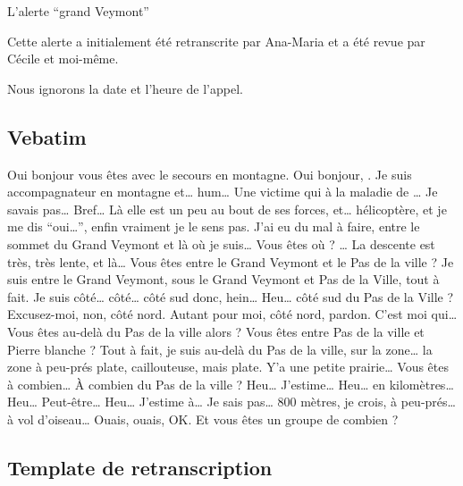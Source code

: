 L'alerte \enquote{grand Veymont}


Cette alerte a initialement été retranscrite par Ana-Maria
 et a été revue par Cécile  et
moi-même.

Nous ignorons la date et l'heure de l'appel.

\subsection{Vebatim}
\label{anx:retrans-gv-verb}


\begin{dialogue}
  \Sec Oui bonjour vous êtes avec le secours en montagne.
  \Req Oui bonjour, . Je suis accompagnateur en
  montagne et… hum… Une victime qui à la maladie de
  … Je savais pas… Bref… Là elle est un peu au bout de
  ses forces, et…  hélicoptère, et je me dis
  \enquote{oui…}, enfin vraiment je le sens pas. J'ai eu du mal à
  faire, entre le sommet du Grand Veymont et là où je suis…
  \Sec {} Vous êtes où ?
  \Req … La descente est très, très lente, et là…
  \Sec Vous êtes entre le Grand Veymont et le Pas de la ville ?
  \Req Je suis entre le Grand Veymont, sous le Grand Veymont et Pas de
  la Ville, tout à fait. Je suis côté… côté… côté sud donc, hein…
  \Sec Heu… côté sud du Pas de la Ville ?
  \Req Excusez-moi, non, côté nord. Autant pour moi, côté nord,
  pardon. C'est moi qui…
  \Sec Vous êtes au-delà du Pas de la ville alors ? Vous êtes entre
  Pas de la ville et Pierre blanche ?
  \Req Tout à fait, je suis au-delà du Pas de la ville, sur la zone…
  la zone à peu-prés plate, caillouteuse, mais plate. Y'a une petite
  prairie…
  \Sec Vous êtes à combien… À combien du Pas de la ville ?
  \Req Heu… J'estime… Heu… en kilomètres… Heu… Peut-être… Heu…
  J'estime à… Je sais pas… 800 mètres, je crois, à peu-prés… à vol
  d'oiseau…
  \Sec Ouais, ouais, OK. Et vous êtes un groupe de combien ?
\end{dialogue}


\subsection{Template de retranscription}
\label{anx:retrans-gv-retrans}

